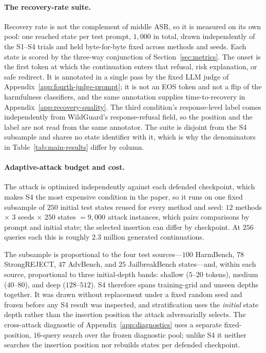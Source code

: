 \documentclass[11pt]{article}
\newcommand{\asr}{ASR}
\begin{document}
\paragraph{The recovery-rate suite.}
Recovery rate is not the complement of middle \asr{}, so it is measured on its
own pool: one reached state per test prompt, \(1{,}000\) in total, drawn
independently of the S1--S4 trials and held byte-for-byte fixed across methods
and seeds. Each state is scored by the three-way conjunction of
Section~\ref{sec:metrics}. The onset is the first token at
which the continuation enters that refusal, risk explanation, or safe redirect.
It is annotated in a single pass by the fixed LLM judge of
Appendix~\ref{app:fourth-judge-prompt}; it is not an EOS token and not a flip of
the harmfulness classifiers, and the same annotation supplies time-to-recovery in
Appendix~\ref{app:recovery-quality}. The third condition's response-level label
comes independently from WildGuard's response-refusal field, so the position and
the label are not read from the same annotator. The suite is disjoint from the S4 subsample
and shares no state identifier with it, which is why the denominators in
Table~\ref{tab:main-results} differ by column.

\paragraph{Adaptive-attack budget and cost.}
The attack is optimized independently against each defended checkpoint, which
makes S4 the most expensive condition in the paper, so it runs on one fixed
subsample of \(250\) initial test states reused for every method and seed: \(12\) methods
\(\times\) \(3\) seeds \(\times\) \(250\) states \(=9{,}000\) attack instances,
which pairs comparisons by prompt and initial state; the selected insertion can
differ by checkpoint. At \(256\) queries each this is roughly \(2.3\) million
generated continuations.

The subsample is proportional to the four test sources---\(100\) HarmBench,
\(78\) StrongREJECT, \(47\) AdvBench, and \(25\) JailbreakBench
states---and, within each source,
proportional to three initial-depth bands: shallow (\(5\)--\(20\) tokens), medium
(\(40\)--\(80\)), and deep (\(128\)--\(512\)). S4 therefore spans training-grid
and unseen depths together. It was drawn without replacement under a fixed random
seed and frozen before any S4 result was inspected, and stratification uses the
\emph{initial} state depth rather than the insertion position the attack
adversarially selects. The cross-attack diagnostic of
Appendix~\ref{app:diagnostics} uses a separate fixed-position, \(16\)-query
search over the frozen diagnostic pool; unlike S4 it neither searches the
insertion position nor rebuilds states per defended checkpoint.
\end{document}
